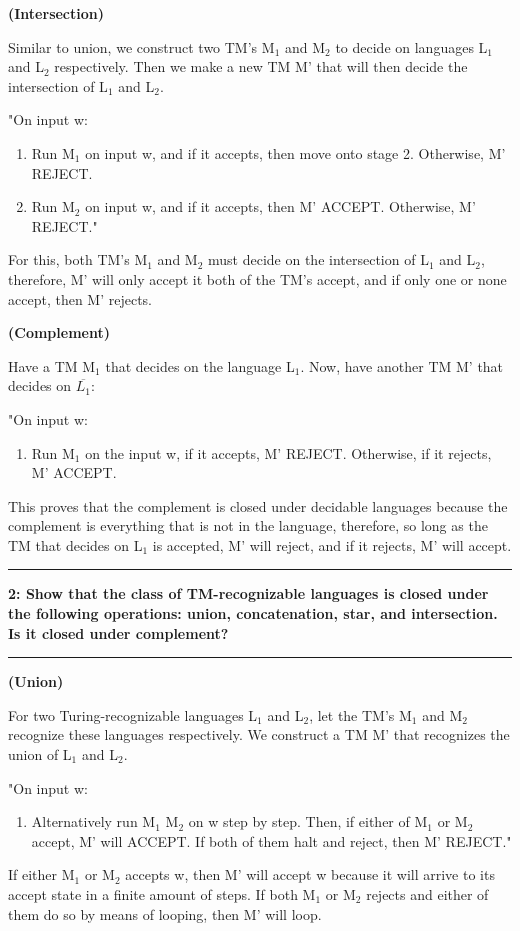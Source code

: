 \documentclass[11pt]{article}
\newcommand\question[2]{\vspace{.25in}\hrule\textbf{#1: #2}\vspace{.5em}\hrule\vspace{.10in}}
\renewcommand\part[1]{\vspace{.10in}\textbf{(#1)}\par}
\begin{document}
	
	\part{Intersection}
		Similar to union, we construct two TM's M$_{1}$ and M$_{2}$ to decide on languages L$_{1}$ and L$_{2}$ respectively. Then we make a new TM M' that will then decide the intersection of L$_{1}$ and L$_{2}$.\par
		"On input w:
		\begin{enumerate}
			\item Run M$_{1}$ on input w, and if it accepts, then move onto stage 2. Otherwise, M' REJECT.
			\item Run M$_{2}$ on input w, and if it accepts, then M' ACCEPT. Otherwise, M' REJECT."
		\end{enumerate}
		For this, both TM's M$_{1}$ and M$_{2}$ must decide on the intersection of L$_{1}$ and L$_{2}$, therefore, M' will only accept it both of the TM's accept, and if only one or none accept, then M' rejects. 
	
	\part{Complement}
		Have a TM M$_{1}$ that decides on the language L$_{1}$. Now, have another TM M' that decides on $\overline{L_{1}}$:\par
		"On input w:
		\begin{enumerate}
			\item Run M$_{1}$ on the input w, if it accepts, M' REJECT. Otherwise, if it rejects, M' ACCEPT.
		\end{enumerate}
		
		This proves that the complement is closed under decidable languages because the complement is everything that is not in the language, therefore, so long as the TM that decides on L$_{1}$ is accepted, M' will reject, and if it rejects, M' will accept.

\question{2}{Show that the class of TM-recognizable languages is closed under the following operations:  union, concatenation, star, and intersection.  Is it closed under complement?}

	\part{Union}
		For two Turing-recognizable languages L$_{1}$ and L$_{2}$, let the TM's M$_{1}$ and M$_{2}$ recognize these languages respectively. We construct a TM M' that recognizes the union of L$_{1}$ and L$_{2}$.\par
		"On input w:
		\begin{enumerate}
			\item Alternatively run M$_{1}$ M$_{2}$ on w step by step. Then, if either of M$_{1}$ or M$_{2}$ accept, M' will ACCEPT. If both of them halt and reject, then M' REJECT."
		\end{enumerate}
		If either M$_{1}$ or M$_{2}$ accepts w, then M' will accept w because it will arrive to its accept state in a finite amount of steps. If both M$_{1}$ or M$_{2}$ rejects and either of them do so by means of looping, then M' will loop. 
		
\end{document}
